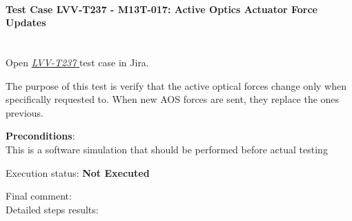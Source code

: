\documentclass[SE,lsstdraft,STR,toc]{lsstdoc}
\begin{document}
\paragraph{Test Case LVV-T237 - M13T-017: Active Optics Actuator Force Updates }\mbox{}\\

Open  \href{https://jira.lsstcorp.org/secure/Tests.jspa#/testCase/LVV-T237}{\textit{ LVV-T237 } }
test case in Jira.

The purpose of this test is verify that the active optical forces change
only when specifically requested to. When new AOS forces are sent, they
replace the ones previous.

\textbf{ Preconditions}:\\
This is a software simulation that should be performed before actual
testing

Execution status: {\bf Not Executed }

Final comment:\\


Detailed steps results:
\end{document}
